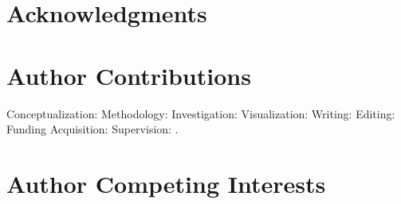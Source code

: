 \documentclass[letterpaper,8pt]{extarticle}  %
\begin{document}
\section{Acknowledgments}
\lipsum[13] 


\section{Author Contributions}
Conceptualization: Methodology: Investigation: Visualization: Writing:  Editing: Funding Acquisition: Supervision: . 

\section{Author Competing Interests}
\lipsum[14][2]

\renewcommand\refname{References}
\begin{footnotesize}
\textnormal{}
\end{footnotesize}
\newpage



\newpage



\end{document}
